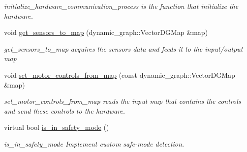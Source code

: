 \begin{DoxyCompactItemize}
\begin{DoxyCompactList}\small\item\em initialize\+\_\+hardware\+\_\+communication\+\_\+process is the function that initialize the hardware. \end{DoxyCompactList}\item 
void \hyperlink{classdg__blmc__robots_1_1DGMStuggihop_a0a54f99691e07866000b28c028947957}{get\+\_\+sensors\+\_\+to\+\_\+map} (dynamic\+\_\+graph\+::\+Vector\+D\+G\+Map \&map)
\begin{DoxyCompactList}\small\item\em get\+\_\+sensors\+\_\+to\+\_\+map acquires the sensors data and feeds it to the input/output map \end{DoxyCompactList}\item 
void \hyperlink{classdg__blmc__robots_1_1DGMStuggihop_a17b70b0c18502cc60461b94f0ca2148b}{set\+\_\+motor\+\_\+controls\+\_\+from\+\_\+map} (const dynamic\+\_\+graph\+::\+Vector\+D\+G\+Map \&map)
\begin{DoxyCompactList}\small\item\em set\+\_\+motor\+\_\+controls\+\_\+from\+\_\+map reads the input map that contains the controls and send these controls to the hardware. \end{DoxyCompactList}\item 
virtual bool \hyperlink{classdg__blmc__robots_1_1DGMStuggihop_a5834264acad3d97e9fb5cdf9c404b875}{is\+\_\+in\+\_\+safety\+\_\+mode} ()\hypertarget{classdg__blmc__robots_1_1DGMStuggihop_a5834264acad3d97e9fb5cdf9c404b875}{}\label{classdg__blmc__robots_1_1DGMStuggihop_a5834264acad3d97e9fb5cdf9c404b875}

\begin{DoxyCompactList}\small\item\em is\+\_\+in\+\_\+safety\+\_\+mode Implement custom safe-\/mode detection. \end{DoxyCompactList}\end{DoxyCompactItemize}
